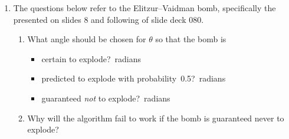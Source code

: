 \documentclass[12pt]{article}
\begin{document}
\begin{enumerate}
\begin{enumerate}[label=\theenumi.\arabic*]
    \LeaveSpace{}
\end{enumerate}
\item{} The questions below refer to the Elitzur--Vaidman bomb, specifically the  presented on slides 8 and following of slide deck 080.
\begin{enumerate}[label=\theenumi.\arabic*]
  \item What angle should be chosen for $\theta$ so that the bomb is
  \begin{itemize}
      \item certain to explode?\Blank{}~radians
      \item predicted to explode with probability~0.5?\Blank{}~radians
  \item guaranteed \emph{not} to explode?\Blank{}~radians
  \end{itemize}
  \item Why will the algorithm fail to work if the bomb is guaranteed never to explode?\LeaveSpace{}
\end{enumerate}


\end{enumerate}
\end{document}

